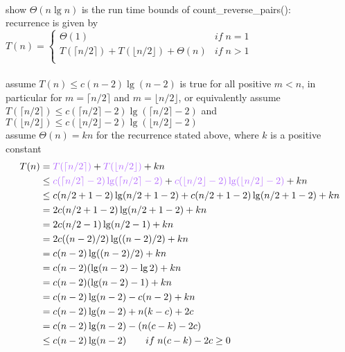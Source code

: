 \documentclass[12pt,border=4pt,multi]{article}%
\begin{document}
\\
\\
\\
show $\Theta(n\lg n)$ is the run time bounds of count\_reverse\_pairs():\\
recurrence is given by\\
$T(n) =
\begin{cases}
    \Theta(1) & if\;n = 1\\
    T(\lceil n / 2 \rceil) + T(\lfloor n / 2 \rfloor) + \Theta(n) & if\;n > 1\\
\end{cases}
$\\
\\
assume $T(n) \leq c(n - 2)\lg(n - 2)$ is true for all positive $m < n$, in particular for $m = \lceil n / 2 \rceil$ and $m = \lfloor n / 2 \rfloor$, or equivalently assume $T(\lceil n / 2 \rceil) \leq c(\lceil n / 2 \rceil - 2)\lg(\lceil n / 2 \rceil - 2)$ and $T(\lfloor n / 2 \rfloor) \leq c(\lfloor n / 2 \rfloor - 2)\lg(\lfloor n / 2 \rfloor - 2)$\\
assume $\Theta(n) = kn$ for the recurrence stated above, where $k$ is a positive constant\\
\begin{align*}
    T(n) &= \textcolor{orchid}{T(\lceil n / 2 \rceil)} + \textcolor{orchid}{T(\lfloor n / 2 \rfloor)} + kn\\
    &\leq \textcolor{orchid}{c(\lceil n / 2 \rceil - 2)\lg(\lceil n / 2 \rceil - 2)} + \textcolor{orchid}{c(\lfloor n / 2 \rfloor - 2)\lg(\lfloor n / 2 \rfloor - 2)} + kn\\
    &\leq c(n / 2 + 1 - 2)\lg(n / 2 + 1 - 2) + c(n / 2 + 1 - 2)\lg(n / 2 + 1 - 2) + kn\\
    &= 2c(n / 2 + 1 - 2)\lg(n / 2 + 1 - 2) + kn\\
    &= 2c(n / 2 - 1)\lg(n / 2 - 1) + kn\\
    &= 2c((n - 2)/ 2)\lg((n - 2)/ 2) + kn\\
    &= c(n - 2)\lg((n - 2)/ 2) + kn\\
    &= c(n - 2)(\lg(n - 2) - \lg 2) + kn\\
    &= c(n - 2)(\lg(n - 2) - 1) + kn\\
    &= c(n - 2)\lg(n - 2) - c(n - 2) + kn\\
    &= c(n - 2)\lg(n - 2) + n(k - c) + 2c\\
    &= c(n - 2)\lg(n - 2) - (n(c - k) - 2c)\\
    &\leq c(n - 2)\lg(n - 2) \qquad if\;n(c - k) - 2c \geq 0\\
\end{align*}
\end{document}
